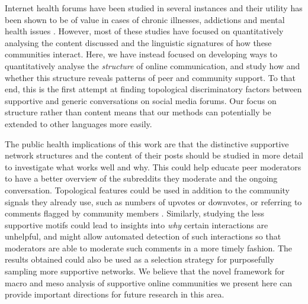 Internet health forums have been studied in several instances and their utility has been shown to be of value in cases of chronic illnesses\cite{Joglekar2018}, addictions\cite{wood2009evaluation} and mental health issues \cite{gkotsis2017characterisation,de2013social}. However, most of these studies have focused on quantitatively analysing
the content discussed and the linguistic signatures of how these communities interact.
Here, we have instead focused on developing ways to quantitatively analyse the \emph{structure} of online communication, and study how and whether this structure reveals patterns of peer and community support.
To that end, this is the first attempt at finding topological discriminatory factors between supportive and generic conversations on social media forums. Our focus on structure rather than content means that our methods can potentially be extended to other languages more easily.

The public health implications of this work are that the distinctive supportive network structures and the content of their posts should be studied in more detail to investigate what works well and why.  This could help educate peer moderators to have a better overview of the subreddits they moderate and the ongoing conversation. Topological features could be used in addition to the community signals they already use, such as numbers of upvotes or downvotes, or referring to comments flagged by community members  \cite{choudhury_language_2017}.  Similarly, studying the less supportive motifs could lead to insights into \emph{why} certain interactions are unhelpful, and might allow automated detection of such interactions so that moderators are able to moderate such comments in a more timely fashion.  The results obtained could also be used as a selection strategy for purposefully sampling more supportive networks. We believe that the novel framework for macro and meso analysis of supportive online communities we present here can provide important directions for future research in this area.  